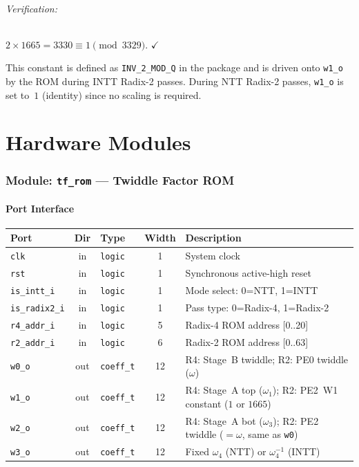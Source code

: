 \documentclass[11pt,a4paper]{article}
\newcommand{\sv}[1]{\texttt{#1}}
\newcommand{\port}[1]{\texttt{#1}}
\begin{document}
\paragraph{Verification:} $2 \times 1665 = 3330 \equiv 1 \pmod{3329}$. $\checkmark$

This constant is defined as \texttt{INV\_2\_MOD\_Q} in the package and is driven onto \port{w1\_o} by the ROM during INTT Radix-2 passes. During NTT Radix-2 passes, \port{w1\_o} is set to~$1$ (identity) since no scaling is required.

\part{Hardware Modules}

\section{Module: \sv{tf\_rom} --- Twiddle Factor ROM}
\label{sec:tf-rom-module}

\subsection{Port Interface}

\begin{center}
\renewcommand{\arraystretch}{1.3}
\begin{tabular}{lclcp{7.2cm}}
  \toprule
  \textbf{Port} & \textbf{Dir} & \textbf{Type} & \textbf{Width} & \textbf{Description} \\
  \midrule
  \port{clk}         & in  & \sv{logic}   & 1  & System clock \\
  \port{rst}         & in  & \sv{logic}   & 1  & Synchronous active-high reset \\
  \port{is\_intt\_i}  & in  & \sv{logic}   & 1  & Mode select: 0=NTT, 1=INTT \\
  \port{is\_radix2\_i}& in  & \sv{logic}   & 1  & Pass type: 0=Radix-4, 1=Radix-2 \\
  \port{r4\_addr\_i}  & in  & \sv{logic}   & 5  & Radix-4 ROM address [0..20] \\
  \port{r2\_addr\_i}  & in  & \sv{logic}   & 6  & Radix-2 ROM address [0..63] \\
  \midrule
  \port{w0\_o}       & out & \sv{coeff\_t} & 12 & R4: Stage~B twiddle; R2: PE0 twiddle ($\omega$) \\
  \port{w1\_o}       & out & \sv{coeff\_t} & 12 & R4: Stage~A top ($\omega_1$); R2: PE2~W1 constant ($1$ or $1665$) \\
  \port{w2\_o}       & out & \sv{coeff\_t} & 12 & R4: Stage~A bot ($\omega_3$); R2: PE2 twiddle ($=\omega$, same as \port{w0}) \\
  \port{w3\_o}       & out & \sv{coeff\_t} & 12 & Fixed $\omega_4$ (NTT) or $\omega_4^{-1}$ (INTT) \\
  \bottomrule
\end{tabular}
\end{center}
\end{document}
